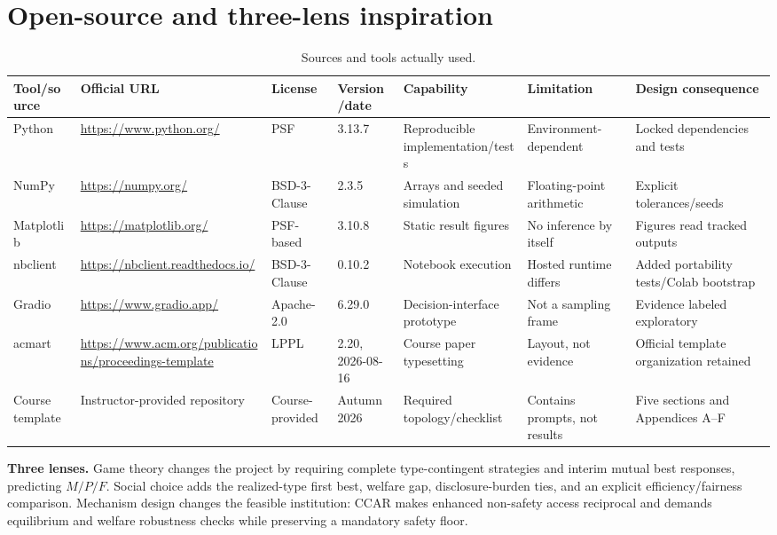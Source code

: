 \section{Open-source and three-lens inspiration}
\begin{table}[H]
\caption{Sources and tools actually used.}
\centering\scriptsize
\begin{tabularx}{\textwidth}{@{}p{1.6cm}p{2.5cm}p{1.6cm}p{1.4cm}YYY@{}}\toprule
Tool/source & Official URL & License & Version/date & Capability & Limitation & Design consequence \\\midrule
Python & \url{https://www.python.org/} & PSF & 3.13.7 & Reproducible implementation/tests & Environment-dependent & Locked dependencies and tests \\
NumPy & \url{https://numpy.org/} & BSD-3-Clause & 2.3.5 & Arrays and seeded simulation & Floating-point arithmetic & Explicit tolerances/seeds \\
Matplotlib & \url{https://matplotlib.org/} & PSF-based & 3.10.8 & Static result figures & No inference by itself & Figures read tracked outputs \\
nbclient & \url{https://nbclient.readthedocs.io/} & BSD-3-Clause & 0.10.2 & Notebook execution & Hosted runtime differs & Added portability tests/Colab bootstrap \\
Gradio & \url{https://www.gradio.app/} & Apache-2.0 & 6.29.0 & Decision-interface prototype & Not a sampling frame & Evidence labeled exploratory \\
acmart & \url{https://www.acm.org/publications/proceedings-template} & LPPL & 2.20, 2026-08-16 & Course paper typesetting & Layout, not evidence & Official template organization retained \\
Course template & Instructor-provided repository & Course-provided & Autumn 2026 & Required topology/checklist & Contains prompts, not results & Five sections and Appendices A--F \\
\bottomrule\end{tabularx}
\end{table}

\noindent\textbf{Three lenses.} Game theory changes the project by requiring complete type-contingent strategies and interim mutual best responses, predicting $M/P/F$. Social choice adds the realized-type first best, welfare gap, disclosure-burden ties, and an explicit efficiency/fairness comparison. Mechanism design changes the feasible institution: CCAR makes enhanced non-safety access reciprocal and demands equilibrium and welfare robustness checks while preserving a mandatory safety floor.

